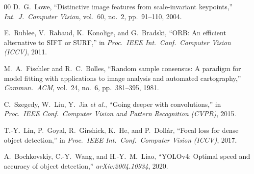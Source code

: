 \documentclass[conference]{IEEEtran}
\begin{document}
\begin{thebibliography}{00}
D.~G.~Lowe, ``Distinctive image features from scale-invariant
keypoints,'' \textit{Int.\ J.\ Computer Vision}, vol.~60, no.~2,
pp.~91--110, 2004.

E.~Rublee, V.~Rabaud, K.~Konolige, and G.~Bradski, ``ORB: An efficient
alternative to SIFT or SURF,'' in \textit{Proc.\ IEEE Int.\ Conf.\
Computer Vision (ICCV)}, 2011.

M.~A.~Fischler and R.~C.~Bolles, ``Random sample consensus: A paradigm
for model fitting with applications to image analysis and automated
cartography,'' \textit{Commun.\ ACM}, vol.~24, no.~6, pp.~381--395, 1981.

C.~Szegedy, W.~Liu, Y.~Jia \textit{et al.}, ``Going deeper with
convolutions,'' in \textit{Proc.\ IEEE Conf.\ Computer Vision and
Pattern Recognition (CVPR)}, 2015.

T.-Y.~Lin, P.~Goyal, R.~Girshick, K.~He, and P.~Doll\'{a}r, ``Focal
loss for dense object detection,'' in \textit{Proc.\ IEEE Int.\ Conf.\
Computer Vision (ICCV)}, 2017.

A.~Bochkovskiy, C.-Y.~Wang, and H.-Y.~M.~Liao, ``YOLOv4: Optimal speed
and accuracy of object detection,'' \textit{arXiv:2004.10934}, 2020.

\end{thebibliography}
\end{document}
